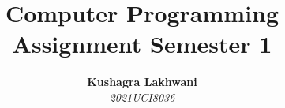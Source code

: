 \newcommand{\hmwkTitle}{Assignment Semester 1} %
\newcommand{\hmwkClass}{Computer Programming} %
\newcommand{\hmwkDueDate}{Due\ Date} %

\date{}

\title{
    \vspace{2in}
    \textmd{\textbf{\hmwkClass}}\\
    \normalsize\vspace{0.1in}\small{\hmwkTitle}\\
    \vspace{3.in}
}

\newcommand{\hmwkAuthorNameOne}{Kushagra Lakhwani}
\newcommand{\hmwkAuthorNumberOne}{2021UCI8036}

\author{
    \textbf{\hmwkAuthorNameOne}\\
    \textit{\hmwkAuthorNumberOne}
}
